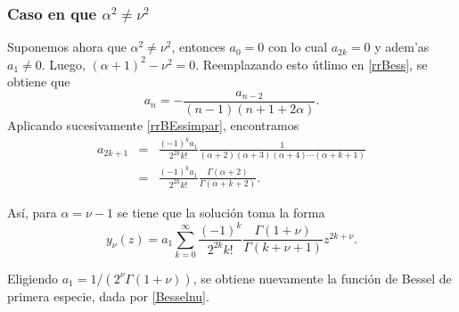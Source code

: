 \subsubsection{Caso en que $\alpha^2\neq\nu^2$}
Suponemos ahora que $\alpha^2\neq\nu^2$, entonces $a_0=0$ con lo cual $a_{2k}= 0$ y adem'as  $a_1\neq 0$. Luego, $(\alpha+1)^2-\nu^2=0$. Reemplazando esto \'utlimo en \eqref{rrBess}, se obtiene que
\begin{equation} \label{rrBEssimpar}
a_n=-\frac{a_{n-2}}{(n-1)(n+1+2\alpha)}.
\end{equation}
Aplicando sucesivamente \eqref{rrBEssimpar}, encontramos
\begin{eqnarray}
a_{2k+1}&=&\frac{(-1)^ka_1}{2^{2k}k!}\frac{1}{(\alpha+2)(\alpha+3)(\alpha+4)\cdots (\alpha +k+1)}\\
&=&\frac{(-1)^ka_1}{2^{2k }k!}\frac{\Gamma(\alpha+2)}{\Gamma(\alpha+k+2)}.
\end{eqnarray}

As\'i, para $\alpha=\nu-1$ se tiene que la soluci\'on toma la forma
\begin{equation}
y_\nu(z) = a_1 \sum_{k=0}^\infty \frac{(-1)^k}{2^{2k}k!}\frac{\Gamma(1+\nu)}{\Gamma(k+\nu+ 1) }
z^{2k+\nu}.
\end{equation}

Eligiendo $a_1=1/(2^{\nu}\Gamma(1+\nu))$, se obtiene nuevamente la funci\'on de Bessel de primera especie, dada por \eqref{Besselnu}.




